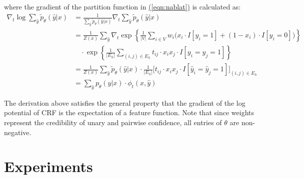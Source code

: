 \documentclass[11pt,a4paper]{book}
\begin{document}
where the gradient of the partition function in \hyperref[eqn:nablat]{(\ref{eqn:nablat})} is calculated as:
\begin{align}
\nabla_t\log\sum_{\hat{y}}\tilde{p}_\theta(\hat{y}|x)&=\frac{1}{\sum_{\hat{y}}\tilde{p}_\theta(\hat{y}|x)}\nabla_t\sum_{\hat{y}}\tilde{p}_\theta(\hat{y}|x)\nonumber\\
&=\frac{1}{Z(x)}\sum_{\hat{y}}\nabla_t\exp\left\{\frac{1}{|V|}\sum_{i\in V}w_i\big(x_i\cdot I[y_i=1]+(1-x_i)\cdot I[y_i=0]\big)\right\}\nonumber\\
&\quad\cdot\exp\left\{\frac{1}{|E_h|}\sum_{(i,j)\in E_h}t_{ij}\cdot x_ix_j\cdot I[y_i=y_j=1]\right\}\nonumber\\
&=\frac{1}{Z(x)}\sum_{\hat{y}}\tilde{p}_\theta(\hat{y}|x)\cdot\frac{1}{|E_h|}\Big[t_{ij}\cdot x_ix_j\cdot I[\hat{y}_i=\hat{y}_j=1]\Big]_{(i,j)\in E_h}\nonumber\\
&=\sum_{\hat{y}}p_\theta(\hat{y}|x)\cdot\phi_t(x,\hat{y})
\end{align}

The derivation above satisfies the general property that the gradient of the log potential of CRF is the expectation of a feature function. Note that since weights represent the credibility of unary and pairwise confidence, all entries of $\theta$ are non-negative.

\section{Experiments}
\label{sec:exp2}
\end{document}
